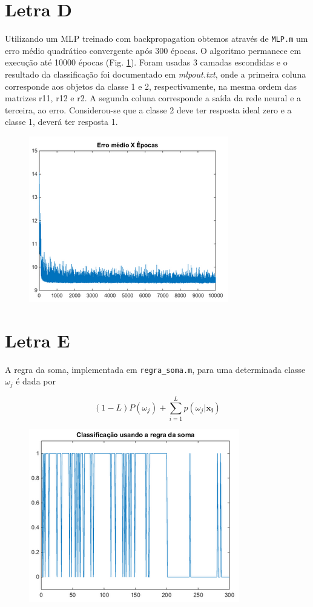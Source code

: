 \documentclass[12pt,twoside]{report}
\newcommand{\figureref}[1]{Fig. \ref{fig:#1}}
\newcommand{\code}[1]{\texttt{#1}}
\begin{document}
\section*{Letra D}

Utilizando um MLP treinado com backpropagation obtemos através de \code{MLP.m} um
erro médio quadrático convergente após 300 épocas. O algoritmo permanece em execução
até 10000 épocas (\figureref{mse_x_epochs}). Foram usadas 3 camadas escondidas e
o resultado da classificação foi documentado em \emph{mlpout.txt}, onde a primeira
coluna corresponde aos objetos da classe 1 e 2, respectivamente, na mesma ordem
das matrizes r11, r12 e r2. A segunda coluna corresponde a saída da rede neural
e a terceira, ao erro. Considerou-se que a classe 2 deve ter resposta ideal zero
e a classe 1, deverá ter resposta 1.

\begin{figure}[ht]
    \centering
    \includegraphics[scale=0.75]{mse_x_epochs}
    \caption{}
    \label{fig:mse_x_epochs}
\end{figure}


\section*{Letra E}

A regra da soma, implementada em \code{regra\_soma.m}, para uma determinada classe
$\omega_j$ é dada por

\begin{equation}
(1 - L) P(\omega_j) + \sum_{i=1}^L p(\omega_j|\mathbf{x_i})
\label{eq:sum_prob_posteriori}
\end{equation}

\begin{figure}[ht]
    \centering
    \includegraphics[scale=0.75]{sum_rule}
    \caption{}
    \label{fig:sum_rule}
\end{figure}


\printbibliography
\end{document}
